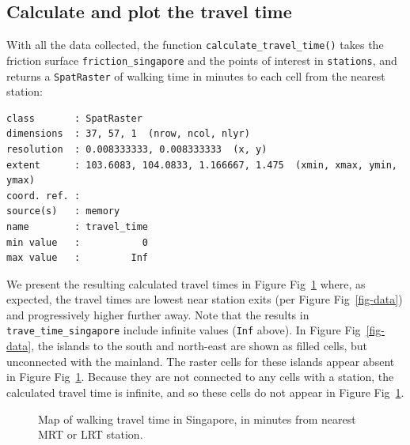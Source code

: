 \documentclass[
  10pt,
  letterpaper,
]{article}
\begin{document}
\subsection{Calculate and plot the travel
time}\label{calculate-and-plot-the-travel-time}

With all the data collected, the function
\texttt{calculate\_travel\_time()} takes the friction surface
\texttt{friction\_singapore} and the points of interest in
\texttt{stations}, and returns a \texttt{SpatRaster} of walking time in
minutes to each cell from the nearest station:

\begin{verbatim}
class       : SpatRaster 
dimensions  : 37, 57, 1  (nrow, ncol, nlyr)
resolution  : 0.008333333, 0.008333333  (x, y)
extent      : 103.6083, 104.0833, 1.166667, 1.475  (xmin, xmax, ymin, ymax)
coord. ref. :  
source(s)   : memory
name        : travel_time 
min value   :           0 
max value   :         Inf 
\end{verbatim}

We present the resulting calculated travel times in Figure
Fig~\ref{fig-result} where, as expected, the travel times are lowest
near station exits (per Figure Fig~\ref{fig-data}) and progressively
higher further away. Note that the results in
\texttt{trave\_time\_singapore} include infinite values (\texttt{Inf}
above). In Figure Fig~\ref{fig-data}, the islands to the south and
north-east are shown as filled cells, but unconnected with the mainland.
The raster cells for these islands appear absent in Figure
Fig~\ref{fig-result}. Because they are not connected to any cells with a
station, the calculated travel time is infinite, and so these cells do
not appear in Figure Fig~\ref{fig-result}.

\begin{figure}


\caption{\label{fig-result}Map of walking travel time in Singapore, in
minutes from nearest MRT or LRT station.}

\end{figure}%
\end{document}
